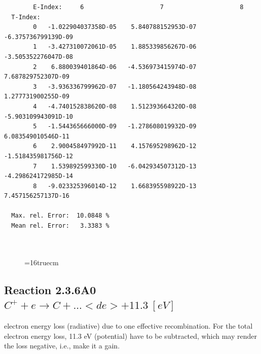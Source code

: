 \documentclass[12pt,dvips]{article}
\begin{document}
\begin{small}
\begin{verbatim}
        E-Index:     6                     7                     8
  T-Index:
        0   -1.022904037358D-05    5.840788152953D-07   -6.375736799139D-09
        1   -3.427310072061D-05    1.885339856267D-06   -3.505352276047D-08
        2    6.880039401864D-06   -4.536973415974D-07    7.687829752307D-09
        3   -3.936336799962D-07   -1.180564243948D-08    1.277731900255D-09
        4   -4.740152838620D-08    1.512393664320D-08   -5.903109943091D-10
        5   -1.544365666000D-09   -1.278608019932D-09    6.083549010546D-11
        6    2.900458497992D-11    4.157695298962D-12   -1.518435981756D-12
        7    1.539892599330D-10   -6.042934507312D-13   -4.298624172985D-14
        8   -9.023325396014D-12    1.668395598922D-13    7.457156257137D-16

  Max. rel. Error:  10.0848 %
  Mean rel. Error:   3.3383 %



\end{verbatim}\end{small}
\begin{figure} \label{2.3.6il1}
\epsfxsize=16truecm
\end{figure}
\newpage

\subsection{
  Reaction 2.3.6A0 $C^+ + e \rightarrow C     + ...   <de>+11.3 \ [eV] $
}

  electron energy loss (radiative) due to one effective recombination.
  For the total electron energy loss, 11.3 eV (potential) have to be
  subtracted, which may render the loss negative, i.e., make it a gain.
\end{document}
